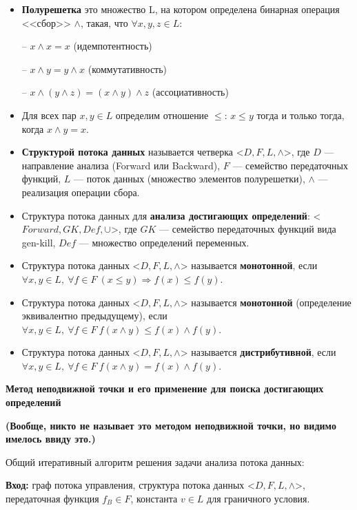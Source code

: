 \begin{itemize}
    \item \textbf{Полурешетка} это множество L, на котором определена бинарная операция <<сбор>> $\land$, такая, что $\forall x, y, z \in L$:
    \item[--] $x \land x = x$ (идемпотентность)
    \item[--] $x \land y = y \land x$ (коммутативность)
    \item[--] $x \land (y \land z) = (x \land y) \land z$ (ассоциативность)
    
    \item Для всех пар $x, y \in L$ определим отношение $\leqslant$: $x \leqslant y$ тогда и только тогда, когда $x \land y = x$.

    \item \textbf{Структурой потока данных} называется четверка <$D, F, L, \land$>, где $D$ --- направление анализа (Forward или Backward), $F$ --- семейство передаточных функций, $L$ --- поток данных (множество элементов полурешетки), $\land$ --- реализация операции сбора.
    \item Структура потока данных для \textbf{анализа достигающих определений}: <$Forward, GK, Def, \cup $>, где $GK$ --- семейство передаточных функций вида gen-kill, $Def$ --- множество определений переменных.
    \item Структура потока данных <$D, F, L, \land$> называется \textbf{монотонной}, если $\forall x, y \in L,~\forall f \in F ~ (x \leqslant y) \Rightarrow f(x) \leqslant f(y)$.
    \item Структура потока данных <$D, F, L, \land$> называется \textbf{монотонной} (определение эквивалентно предыдущему), если $\forall x, y \in L,~\forall f \in F ~ f (x \land y) \leqslant f(x) \land f(y)$.
    \item Структура потока данных <$D, F, L, \land$> называется \textbf{дистрибутивной}, если $\forall x,y \in L,~\forall f \in F ~ f (x \land y) = f (x) \land f (y)$.
\end{itemize}

\textbf{Метод неподвижной точки и его применение для поиска достигающих определений}

\textbf{\textbf{(Вообще, никто не называет это методом неподвижной точки, но видимо имелось ввиду это.)}}

Общий итеративный алгоритм решения задачи анализа потока данных:

\textbf{Вход:} граф потока управления, структура потока данных <$D, F, L, \land$>, передаточная функция $f_B \in F$, константа $v \in L$ для граничного условия.

